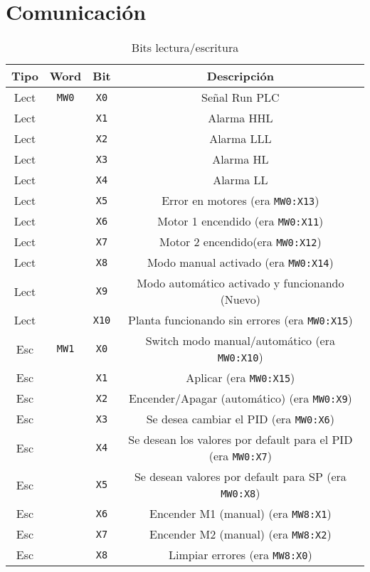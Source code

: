 \section{Comunicación}
\label{sec:Comunicacion}


\begin{table}[!t]

\renewcommand{\arraystretch}{1.3}
\centering
\begin{tabular}{c||c||c||c}
\hline
\bfseries Tipo & \bfseries Word & \bfseries Bit & \bfseries Descripción\\
\hline \hline
Lect & \verb|MW0| & \verb|X0| & Señal Run PLC\\
Lect & & \verb|X1| & Alarma HHL\\
Lect & & \verb|X2|& Alarma LLL\\
Lect & & \verb|X3|& Alarma HL\\
Lect & & \verb|X4|& Alarma LL\\
Lect & & \verb|X5|& Error en motores (era \verb|MW0:X13|)\\
Lect & & \verb|X6|& Motor 1 encendido (era \verb|MW0:X11|)\\
Lect & & \verb|X7|& Motor 2 encendido(era \verb|MW0:X12|)\\
Lect & & \verb|X8|& Modo manual activado (era \verb|MW0:X14|)\\
Lect & & \verb|X9|& Modo automático activado y funcionando (Nuevo)\\
Lect & & \verb|X10|& Planta funcionando sin errores (era \verb|MW0:X15|)\\
\hline
Esc & \verb|MW1| & \verb|X0|& Switch modo manual/automático (era 
\verb|MW0:X10|)\\
Esc & & \verb|X1|& Aplicar (era \verb|MW0:X15|)\\
Esc & & \verb|X2|& Encender/Apagar (automático) (era \verb|MW0:X9|)\\
Esc & & \verb|X3|& Se desea cambiar el PID (era \verb|MW0:X6|)\\
Esc & & \verb|X4|& Se desean los valores por default para el PID (era 
\verb|MW0:X7|)\\
Esc & & \verb|X5|& Se desean valores por default para SP (era \verb|MW0:X8|)\\
Esc & & \verb|X6|& Encender M1 (manual) (era \verb|MW8:X1|)\\
Esc & & \verb|X7|& Encender M2 (manual) (era \verb|MW8:X2|)\\
Esc & & \verb|X8|& Limpiar errores (era \verb|MW8:X0|)\\
\hline

\hline
\end{tabular}
\caption{Bits lectura/escritura}
\label{table:bitlecturasescrituras}
\end{table}

